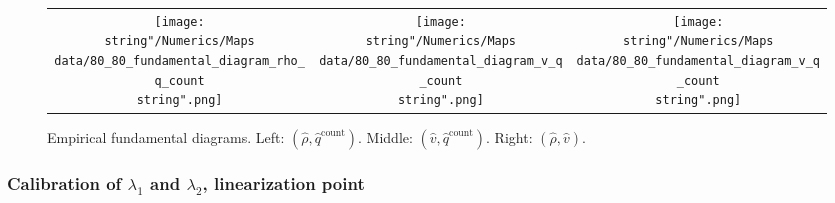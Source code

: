 \documentclass[preprint]{elsarticle}
\begin{document}
\begin{figure}[H]
\centering
\begin{tabular}{ccc}
\texttt{[image: \\string"/Numerics/Maps data/80\_80\_fundamental\_diagram\_rho\_q\_count\\string".png]} & \texttt{[image: \\string"/Numerics/Maps data/80\_80\_fundamental\_diagram\_v\_q\_count\\string".png]} & \texttt{[image: \\string"/Numerics/Maps data/80\_80\_fundamental\_diagram\_v\_q\_count\\string".png]}\tabularnewline
\end{tabular}
\protect\caption{Empirical fundamental diagrams. Left: $\left(\widehat{\rho},\widehat{q}^{\text{count}}\right)$.
Middle: $\left(\widehat{v},\widehat{q}^{\text{count}}\right)$. Right: $\left(\widehat{\rho},\widehat{v}\right)$.
\label{fig:Empirical-fundamental-diagrams}}
\end{figure}



\subsubsection{Calibration of $\lambda_{1}$ and $\lambda_{2}$, linearization point}
\end{document}
